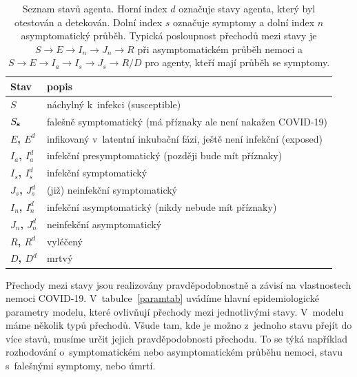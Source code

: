\begin{table}
\centering
  \begin{tabular}{lp{}}
    \hline
		Stav & popis \\\hline
    {\bf $S$} & náchylný k~infekci (susceptible)\\
    {\bf $S_{\bf s}$} & falešně symptomatický (má příznaky ale není nakažen COVID-19)\\ 
    {\bf $E$, $E^d$} & infikovaný v~latentní inkubační fázi, ještě není infekční (exposed) \\
    {\bf $I_{a}$, $I^d_{a}$} & infekční presymptomatický (později bude mít příznaky) \\
    {\bf $I_{s}$, $I^d_{s}$} & infekční symptomatický \\ 
    {\bf $J_{s}$, $J^d_{s}$} & (již) neinfekční symptomatický \\ 
    {\bf $I_{n}$, $I^d_{n}$} & infekční asymptomatický (nikdy nebude mít příznaky) \\ 
    {\bf $J_{ n}$, $J^d_{n}$} & neinfekční asymptomatický \\ 
    {\bf $R$, $R^{d}$} & vyléčený \\
    {\bf $D$, $D^{d}$} & mrtvý  \\
    \hline
  \end{tabular}
  \caption{Seznam stavů agenta. Horní index $d$ označuje stavy agenta, který byl otestován a detekován. Dolní index $s$ označuje symptomy a dolní index $n$ asymptomatický průběh. Typická posloupnost přechodů mezi stavy je $ S \rightarrow  E \rightarrow I_n \rightarrow J_n \rightarrow R$ při asymptomatickém průběh nemoci a $S \rightarrow E \rightarrow I_a \rightarrow I_s \rightarrow J_s \rightarrow R/D$ pro agenty, kteří mají průběh se symptomy.}
  \label{tab:states}
\end{table} 

Přechody mezi stavy jsou realizovány pravděpodobnostně a závisí na vlastnostech nemoci COVID-19. V~tabulce~\ref{paramtab} uvádíme hlavní epidemiologické parametry modelu, které ovlivňují přechody mezi jednotlivými stavy. V~modelu máme několik typů přechodů. Všude tam, kde je možno z~jednoho stavu přejít do více stavů, musíme určit jejich pravděpodobnosti přechodu. To se týká například rozhodování o~symptomatickém nebo asymptomatickém průběhu nemoci, stavu s~falešnými symptomy, nebo úmrtí. 

